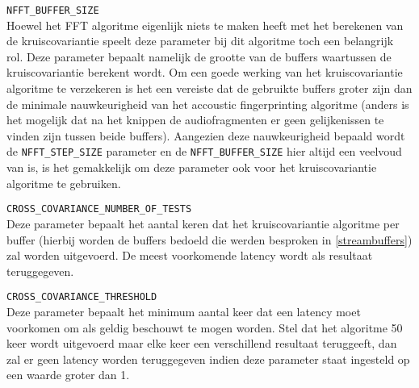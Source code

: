 \begin{description}	
	\item\texttt{NFFT\_BUFFER\_SIZE} \hfill \\
	Hoewel het FFT algoritme eigenlijk niets te maken heeft met het berekenen van de kruiscovariantie speelt deze parameter bij dit algoritme toch een belangrijk rol. Deze parameter bepaalt namelijk de grootte van de buffers waartussen de kruiscovariantie berekent wordt. Om een goede werking van het kruiscovariantie algoritme te verzekeren is het een vereiste dat de gebruikte buffers groter zijn dan de minimale nauwkeurigheid van het accoustic fingerprinting algoritme (anders is het mogelijk dat na het knippen de audiofragmenten er geen gelijkenissen te vinden zijn tussen beide buffers). Aangezien deze nauwkeurigheid bepaald wordt de \texttt{NFFT\_STEP\_SIZE} parameter en de \texttt{NFFT\_BUFFER\_SIZE} hier altijd een veelvoud van is, is het gemakkelijk om deze parameter ook voor het kruiscovariantie algoritme te gebruiken.
	
	\item\texttt{CROSS\_COVARIANCE\_NUMBER\_OF\_TESTS} \hfill \\
	Deze parameter bepaalt het aantal keren dat het kruiscovariantie algoritme per buffer (hierbij worden de buffers bedoeld die werden besproken in \ref{streambuffers}) zal worden uitgevoerd. De meest voorkomende latency wordt als resultaat teruggegeven.
	
	\item\texttt{CROSS\_COVARIANCE\_THRESHOLD} \hfill \\
	Deze parameter bepaalt het minimum aantal keer dat een latency moet voorkomen om als geldig beschouwt te mogen worden.	Stel dat het algoritme 50 keer wordt uitgevoerd maar elke keer een verschillend resultaat teruggeeft, dan zal er geen latency worden teruggegeven indien deze parameter staat ingesteld op een waarde groter dan 1.
	
\end{description}


